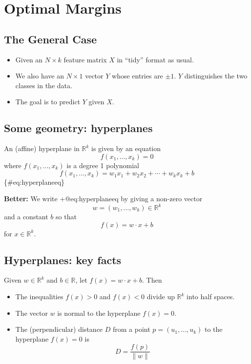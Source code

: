 \documentclass[
  14pt,
]{extarticle}
\author{}
\date{}
\providecommand{\tightlist}{%
  \setlength{\itemsep}{0pt}\setlength{\parskip}{0pt}}
\begin{document}
\hypertarget{optimal-margins}{%
\section{Optimal Margins}\label{optimal-margins}}

\hypertarget{the-general-case}{%
\subsection{The General Case}\label{the-general-case}}

\begin{itemize}
\tightlist
\item
  Given an \(N\times k\) feature matrix \(X\) in ``tidy'' format as
  usual.
\item
  We also have an \(N\times 1\) vector \(Y\) whose entries are
  \(\pm 1\). \(Y\) distinguishes the two classes in the data.
\item
  The goal is to predict \(Y\) given \(X\).
\end{itemize}

\newpage

\hypertarget{some-geometry-hyperplanes}{%
\subsection{Some geometry:
hyperplanes}\label{some-geometry-hyperplanes}}

An (affine) hyperplane in \(\mathbb{R}^{k}\) is given by an equation \[
f(x_1,\ldots, x_k)=0
\] where \(f(x_1,\ldots, x_k)\) is a degree 1 polynomial \[
f(x_1,\ldots, x_k)= w_1x_1+w_2x_2+\cdots+w_k x_k + b
\]\{\#eq:hyperplaneeq\}

\textbf{Better:} We write +@eq:hyperplaneeq by giving a non-zero vector
\[w=(w_1,\ldots, w_k)\in\mathbb{R}^{k}\] and a constant \(b\) so that \[
f(x) = w\cdot x+b
\] for \(x\in \mathbb{R}^{k}\).

\newpage

\hypertarget{hyperplanes-key-facts}{%
\subsection{Hyperplanes: key facts}\label{hyperplanes-key-facts}}

Given \(w\in\mathbb{R}^{k}\) and \(b\in \mathbb{R}\), let
\(f(x)=w\cdot x+b\). Then

\begin{itemize}
\item
  The inequalities \(f(x)>0\) and \(f(x)<0\) divide up
  \(\mathbb{R}^{k}\) into half spaces. \vskip 1.5in
\item
  The vector \(w\) is normal to the hyperplane \(f(x)=0\). \vskip 1.5in
\item
  The (perpendicular) distance \(D\) from a point
  \(p=(u_1,\ldots, u_k)\) to the hyperplane \(f(x)=0\) is \[
  D=\frac{f(p)}{\|w\|}
  \]
\end{itemize}
\end{document}
